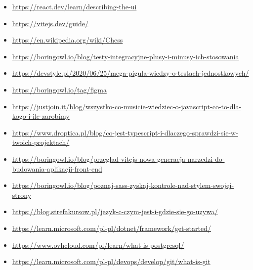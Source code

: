\documentclass[12pt,a4paper]{article}
\begin{document}
\begin{itemize}
    \item \href{https://react.dev/learn/describing-the-ui}{https://react.dev/learn/describing-the-ui}
    \item \href{https://vitejs.dev/guide/}{https://vitejs.dev/guide/}
    \item \href{https://en.wikipedia.org/wiki/Chess}{https://en.wikipedia.org/wiki/Chess}
    \item \href{https://boringowl.io/blog/testy-integracyjne-plusy-i-minusy-ich-stosowania}{https://boringowl.io/blog/testy-integracyjne-plusy-i-minusy-ich-stosowania}
    \item \href{https://devstyle.pl/2020/06/25/mega-pigula-wiedzy-o-testach-jednostkowych/}{https://devstyle.pl/2020/06/25/mega-pigula-wiedzy-o-testach-jednostkowych/}
    \item \href{https://boringowl.io/tag/figma}{https://boringowl.io/tag/figma}
    \item \href{https://justjoin.it/blog/wszystko-co-musicie-wiedziec-o-javascript-co-to-dla-kogo-i-ile-zarobimy}{https://justjoin.it/blog/wszystko-co-musicie-wiedziec-o-javascript-co-to-dla-kogo-i-ile-zarobimy}
    \item \href{https://www.droptica.pl/blog/co-jest-typescript-i-dlaczego-sprawdzi-sie-w-twoich-projektach/}{https://www.droptica.pl/blog/co-jest-typescript-i-dlaczego-sprawdzi-sie-w-twoich-projektach/}
    \item \href{https://boringowl.io/blog/przeglad-vitejs-nowa-generacja-narzedzi-do-budowania-aplikacji-front-end}{https://boringowl.io/blog/przeglad-vitejs-nowa-generacja-narzedzi-do-budowania-aplikacji-front-end}
    \item \href{https://boringowl.io/blog/poznaj-sass-zyskaj-kontrole-nad-stylem-swojej-strony}{https://boringowl.io/blog/poznaj-sass-zyskaj-kontrole-nad-stylem-swojej-strony}
    \item \href{https://blog.strefakursow.pl/jezyk-c-czym-jest-i-gdzie-sie-go-uzywa/}{https://blog.strefakursow.pl/jezyk-c-czym-jest-i-gdzie-sie-go-uzywa/}
    \item \href{https://learn.microsoft.com/pl-pl/dotnet/framework/get-started/}{https://learn.microsoft.com/pl-pl/dotnet/framework/get-started/}
    \item \href{https://www.ovhcloud.com/pl/learn/what-is-postgresql/}{https://www.ovhcloud.com/pl/learn/what-is-postgresql/}
    \item \href{https://learn.microsoft.com/pl-pl/devops/develop/git/what-is-git}{https://learn.microsoft.com/pl-pl/devops/develop/git/what-is-git}

\end{itemize}
\end{document}
